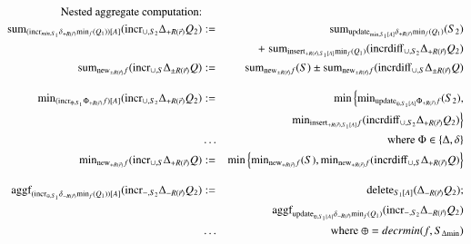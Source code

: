 \documentclass{article}
\begin{document}
%
\begin{figure*}
\begin{eqnarray}
\mbox{Nested aggregate computation:} && \nonumber
\\
\label{eq:na1}
\algsum_{(\algincr_{min, S_1} \delta_{+R(\vec{r})} \algmin_{f}(Q_1))[A]}
(\algincr_{\cup,S_2} \Delta_{+R(\vec{r})} Q_2)
&:=&
\algsum_{\algupdate_{\min, S_{1}[A]} \delta_{+R(\vec{r})} \algmin_{f}(Q_1)}(S_2)
\\
\nonumber &&
+ \; \algsum_{\alginsert_{+R(\vec{r}), S_{1}[A]} \algmin_{f}(Q_1)}
    (\algincrdiff_{\cup, S_2} \Delta_{+R(\vec{r})} Q_2)
\\
\label{eq:na2}
\algsum_{\algnew_{\pm R(\vec{r})} f} (\algincr_{\cup,S} \Delta_{\pm R(\vec{r})} Q)
&:=&
\algsum_{\algnew_{\pm R(\vec{r})} f}(S) 
    \pm \algsum_{\algnew_{\pm R(\vec{r})} f}
        (\algincrdiff_{\cup, S} \Delta_{\pm R(\vec{r})} Q)
%
%
\\[2ex]
\label{eq:na3}
\algmin_{(\algincr_{\oplus, S_1} \Phi_{+ R(\vec{r})} f)[A]}
(\algincr_{\cup, S_2} \Delta_{+R(\vec{r})} Q_2)
&:=&
\min \Big\{
\algmin_{\algupdate_{\oplus, S_1[A]} \Phi_{+R(\vec{r})} f} (S_2),
\\
\nonumber &&
\qquad \; \algmin_{\alginsert_{+R(\vec{r}), S_1[A]} f}
(\algincrdiff_{\cup, S_2} \Delta_{+R(\vec{r})} Q_2)
\Big\}
\\
\nonumber &\dots& \mbox{where $\Phi \in \{\Delta, \delta\}$}
\\
%
%
\label{eq:na4}
\algmin_{\algnew_{+R(\vec{r})} f} (\algincr_{\cup, S} \Delta_{+R(\vec{r})} Q)
&:=&
\min \Big\{
\algmin_{\algnew_{+R(\vec{r})} f} (S), 
\algmin_{\algnew_{+R(\vec{r})} f} (\algincrdiff_{\cup, S} \Delta_{+R(\vec{r})} Q)
\Big\}
%
%
%
\\[2ex]
\label{eq:na5}
\algaggf_{(\algincr_{\oplus, S_1} \delta_{-R(\vec{r})} \algmin_{f}(Q_1))[A]}
(\algincr_{-,S_2} \Delta_{-R(\vec{r})} Q_2)
&:=&
\algdelete_{S_{1}[A]}(\Delta_{-R(\vec{r})} Q_2);
\\
\nonumber &&
\algaggf_{\algupdate_{\oplus, S_{1}[A]}  \delta_{-R(\vec{r})} \algmin_{f}(Q_1)}
(\algincr_{-,S_2} \Delta_{-R(\vec{r})} Q_2)
\\
\nonumber &\dots& \mbox{where $\oplus = decrmin(f, S_{\Delta \algmin})$}
\end{eqnarray}
\end{figure*}



\begin{comment}



\end{comment}
\end{document}

